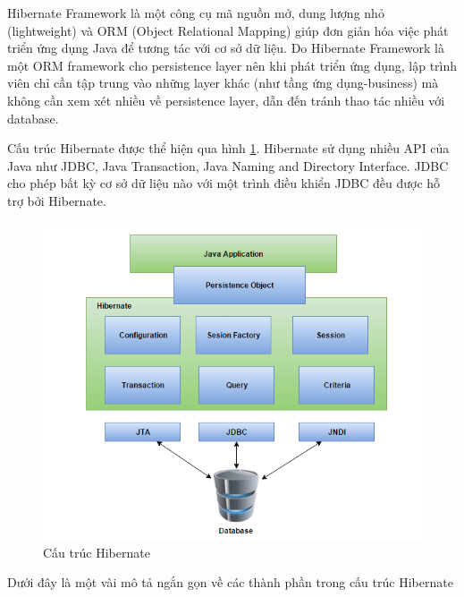 \documentclass[12pt,a4paper,oneside]{extbook}
\begin{document}
Hibernate Framework là một công cụ mã nguồn mở, dung lượng nhỏ (lightweight) và ORM (Object Relational Mapping) giúp đơn giản hóa việc phát triển ứng dụng Java để tương tác với cơ sở dữ liệu. Do Hibernate Framework là một ORM framework cho persistence layer nên khi phát triển ứng dụng, lập trình viên chỉ cần tập trung vào những layer khác (như tầng ứng dụng-business) mà không cần xem xét nhiều về persistence layer, dẫn đến tránh thao tác nhiều với database.

Cấu trúc Hibernate được thể hiện qua hình \ref{fig:3-hibernate-architecture}. Hibernate sử dụng nhiều API của Java như JDBC, Java Transaction, Java Naming and Directory Interface. JDBC cho  phép bất kỳ cơ sở dữ liệu nào với một trình điều khiển JDBC đều được hỗ trợ bởi Hibernate.

\begin{figure}[h]
  \centering
     \includegraphics[width=12cm]{3-hibernate-architecture}
  \caption{Cấu trúc Hibernate}\label{fig:3-hibernate-architecture}
\end{figure}

Dưới đây là một vài mô tả ngắn gọn về các thành phần trong cấu trúc Hibernate
\end{document}
